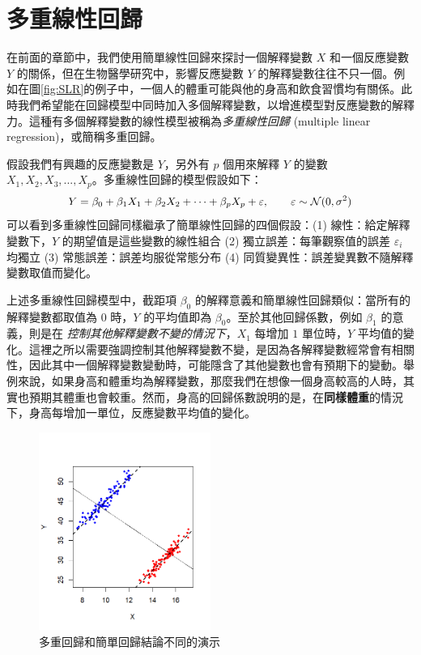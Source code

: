 \section{多重線性回歸}
    在前面的章節中，我們使用簡單線性回歸來探討一個解釋變數 $X$ 和一個反應變數 $Y$ 的關係，但在生物醫學研究中，影響反應變數 $Y$ 的解釋變數往往不只一個。例如在圖\ref{fig:SLR}的例子中，一個人的體重可能與他的身高和飲食習慣均有關係。此時我們希望能在回歸模型中同時加入多個解釋變數，以增進模型對反應變數的解釋力。這種有多個解釋變數的線性模型被稱為\textit{多重線性回歸} (multiple linear regression)，或簡稱多重回歸。

    假設我們有興趣的反應變數是 $Y$，另外有 $p$ 個用來解釋 $Y$ 的變數 $X_1, X_2, X_3,..., X_p$。多重線性回歸的模型假設如下：
    \[Y = \beta_0 + \beta_1 X_1 + \beta_2 X_2 + \cdots + \beta_p X_p + \varepsilon, \qquad \varepsilon \sim \mathcal{N}(0,\sigma^2)\]
    可以看到多重線性回歸同樣繼承了簡單線性回歸的四個假設：(1) 線性：給定解釋變數下，$Y$ 的期望值是這些變數的線性組合 (2) 獨立誤差：每筆觀察值的誤差 $\varepsilon_i$ 均獨立 (3) 常態誤差：誤差均服從常態分布 (4) 同質變異性：誤差變異數不隨解釋變數取值而變化。
    
    上述多重線性回歸模型中，截距項 $\beta_0$ 的解釋意義和簡單線性回歸類似：當所有的解釋變數都取值為 $0$ 時，$Y$ 的平均值即為 $\beta_0$。至於其他回歸係數，例如 $\beta_1$ 的意義，則是在 \textit{控制其他解釋變數不變的情況下}，$X_1$ 每增加 $1$ 單位時，$Y$ 平均值的變化。這裡之所以需要強調控制其他解釋變數不變，是因為各解釋變數經常會有相關性，因此其中一個解釋變數變動時，可能隱含了其他變數也會有預期下的變動。舉例來說，如果身高和體重均為解釋變數，那麼我們在想像一個身高較高的人時，其實也預期其體重也會較重。然而，身高的回歸係數說明的是，在\textbf{同樣體重}的情況下，身高每增加一單位，反應變數平均值的變化。

    \begin{figure}[htbp]
        \centering
        \includegraphics[width=0.5\textwidth]{figures/08-Correlation_linear_regression/confounding.png}
        \caption{多重回歸和簡單回歸結論不同的演示}
        \label{fig:confounding}
    \end{figure}
    
